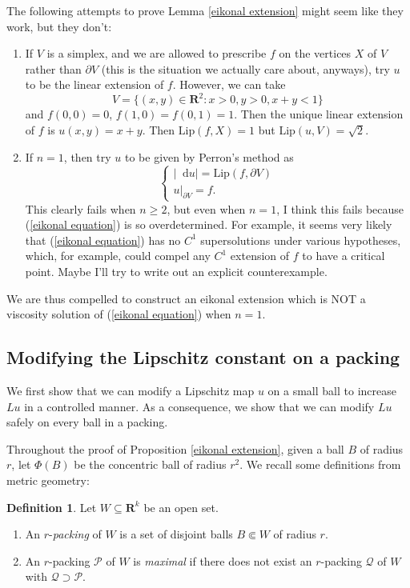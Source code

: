 \documentclass[reqno,11pt]{amsart}
\newcommand{\RR}{\mathbf{R}}
\newcommand*\dif{\mathop{}\!\mathrm{d}}
\newcommand{\Lip}{\mathrm{Lip}}
\newcommand{\dfn}[1]{\emph{#1}\index{#1}}
\theoremstyle{definition}
\newtheorem{definition}[theorem]{Definition}
\numberwithin{equation}{section}
\begin{document}
The following attempts to prove Lemma \ref{eikonal extension} might seem like they work, but they don't:
\begin{enumerate}
\item If $V$ is a simplex, and we are allowed to prescribe $f$ on the vertices $X$ of $V$ rather than $\partial V$ (this is the situation we actually care about, anyways), try $u$ to be the linear extension of $f$.
However, we can take
$$V = \{(x, y) \in \RR^2: x > 0, y > 0, x + y < 1\}$$
and $f(0, 0) = 0$, $f(1, 0) = f(0, 1) = 1$.
Then the unique linear extension of $f$ is $u(x, y) = x + y$.
Then $\Lip(f, X) = 1$ but $\Lip(u, V) = \sqrt 2$.
\item If $n = 1$, then try $u$ to be given by Perron's method as
\begin{equation}\label{eikonal equation}
\begin{cases}
|\dif u| = \Lip(f, \partial V) \\
u|_{\partial V} = f.
\end{cases}
\end{equation}
This clearly fails when $n \geq 2$, but even when $n = 1$, I think this fails because (\ref{eikonal equation}) is so overdetermined.
For example, it seems very likely that (\ref{eikonal equation}) has no $C^1$ supersolutions under various hypotheses, which, for example, could compel any $C^1$ extension of $f$ to have a critical point.
Maybe I'll try to write out an explicit counterexample.
\end{enumerate}
We are thus compelled to construct an eikonal extension which is NOT a viscosity solution of (\ref{eikonal equation}) when $n = 1$.

\subsection{Modifying the Lipschitz constant on a packing}
We first show that we can modify a Lipschitz map $u$ on a small ball to increase $Lu$ in a controlled manner.
As a consequence, we show that we can modify $Lu$ safely on every ball in a packing.

Throughout the proof of Proposition \ref{eikonal extension}, given a ball $B$ of radius $r$, let $\Phi(B)$ be the concentric ball of radius $r^2$.
We recall some definitions from metric geometry:

\begin{definition}
Let $W \subseteq \RR^k$ be an open set.
\begin{enumerate}
\item An $r$-\dfn{packing} of $W$ is a set of disjoint balls $B \Subset W$ of radius $r$.
\item An $r$-packing $\mathscr P$ of $W$ is \dfn{maximal} if there does not exist an $r$-packing $\mathscr Q$ of $W$ with $\mathscr Q \supset \mathscr P$.
\end{enumerate}
\end{definition}
\end{document}
